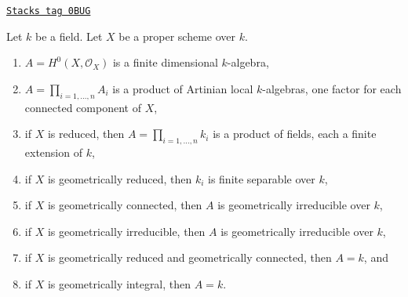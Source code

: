 \begin{lemma}
\label{varieties-lemma-proper-geometrically-reduced-global-sections}
\href{https://stacks.math.columbia.edu/tag/0BUG}{\texttt{Stacks tag 0BUG}}

Let $k$ be a field. Let $X$ be a proper scheme over $k$.
\begin{enumerate}
\item $A = H^0(X, \mathcal{O}_X)$ is a finite dimensional $k$-algebra,
\item $A = \prod_{i = 1, \ldots, n} A_i$ is a product of Artinian
local $k$-algebras, one factor for each connected component of $X$,
\item if $X$ is reduced, then $A = \prod_{i = 1, \ldots, n} k_i$
is a product of fields, each a finite extension of $k$,
\item if $X$ is geometrically reduced, then $k_i$ is finite separable
over $k$,
\item if $X$ is geometrically connected, then $A$ is geometrically
irreducible over $k$,
\item if $X$ is geometrically irreducible, then $A$ is geometrically
irreducible over $k$,
\item if $X$ is geometrically reduced and geometrically connected, then
$A = k$, and
\item if $X$ is geometrically integral, then $A = k$.
\end{enumerate}
\end{lemma}

